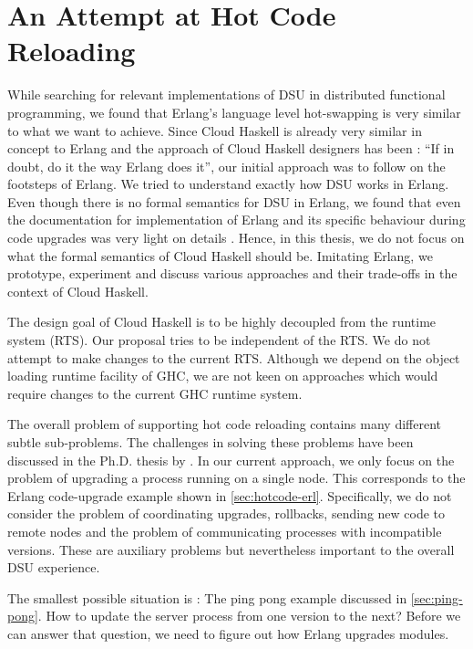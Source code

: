 
\chapter{An Attempt at Hot Code Reloading}

While searching for relevant implementations of DSU in distributed
functional programming, we found that Erlang's language level
hot-swapping \cite{armstrong_concurrent_1993} is very similar to what
we want to achieve. Since Cloud Haskell is already very similar in
concept to Erlang and the approach of Cloud Haskell designers has been
: ``If in doubt, do it the way Erlang does it'', our initial approach
was to follow on the footsteps of Erlang. We tried to understand
exactly how DSU works in Erlang. Even though there is no formal
semantics for DSU in Erlang, we found that even the documentation
\cite{_erlang_????} for implementation of Erlang and its specific
behaviour during code upgrades was very light on details . Hence, in
this thesis, we do not focus on what the formal semantics of Cloud
Haskell should be. Imitating Erlang, we prototype, experiment and
discuss various approaches and their trade-offs in the context of
Cloud Haskell.

The design goal of Cloud Haskell is to be highly decoupled from the
runtime system (RTS). Our proposal tries to be independent of the RTS. We do not
attempt to make changes to the current RTS. Although we depend on the
object loading runtime facility of GHC, we are not keen on approaches
which would require changes to the current GHC runtime system.

The overall problem of supporting hot code reloading contains many
different subtle sub-problems. The challenges in solving these
problems have been discussed in the Ph.D. thesis by
\citeauthor{epstein_functional_2011}
\cite{epstein_functional_2011}. In our current approach, we only focus
on the problem of upgrading a process running on a single node. This
corresponds to the Erlang code-upgrade example shown in
\autoref{sec:hotcode-erl}. Specifically, we do not consider the
problem of coordinating upgrades, rollbacks, sending new code to
remote nodes and the problem of communicating processes with
incompatible versions. These are auxiliary problems but nevertheless
important to the overall DSU experience.

The smallest possible situation is : The ping pong example discussed
in \autoref{sec:ping-pong}. How to update the server process
from one version to the next? Before we can answer that question, we
need to figure out how Erlang upgrades modules.

